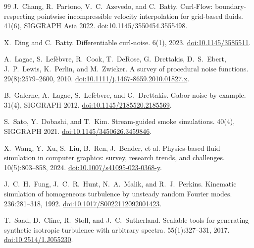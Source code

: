 \documentclass[11pt]{article}
\theoremstyle{remark}
\begin{document}
\begin{thebibliography}{99}
J.~Chang, R.~Partono, V.~C.~Azevedo, and C.~Batty.
\newblock Curl-Flow: boundary-respecting pointwise incompressible velocity
interpolation for grid-based fluids.
 41(6), SIGGRAPH Asia 2022.
\newblock \href{https://doi.org/10.1145/3550454.3555498}{doi:10.1145/3550454.3555498}.

X.~Ding and C.~Batty.
\newblock Differentiable curl-noise.
 6(1), 2023.
\newblock \href{https://doi.org/10.1145/3585511}{doi:10.1145/3585511}.

A.~Lagae, S.~Lef\`ebvre, R.~Cook, T.~DeRose, G.~Drettakis, D.~S.~Ebert,
J.~P.~Lewis, K.~Perlin, and M.~Zwicker.
\newblock A survey of procedural noise functions.
 29(8):2579--2600, 2010.
\newblock \href{https://doi.org/10.1111/j.1467-8659.2010.01827.x}{doi:10.1111/j.1467-8659.2010.01827.x}.

B.~Galerne, A.~Lagae, S.~Lef\`ebvre, and G.~Drettakis.
\newblock Gabor noise by example.
 31(4), SIGGRAPH 2012.
\newblock \href{https://doi.org/10.1145/2185520.2185569}{doi:10.1145/2185520.2185569}.

S.~Sato, Y.~Dobashi, and T.~Kim.
\newblock Stream-guided smoke simulations.
 40(4), SIGGRAPH 2021.
\newblock \href{https://doi.org/10.1145/3450626.3459846}{doi:10.1145/3450626.3459846}.

X.~Wang, Y.~Xu, S.~Liu, B.~Ren, J.~Bender, et al.
\newblock Physics-based fluid simulation in computer graphics: survey, research
trends, and challenges.
 10(5):803--858, 2024.
\newblock \href{https://doi.org/10.1007/s41095-023-0368-y}{doi:10.1007/s41095-023-0368-y}.

J.~C.~H.~Fung, J.~C.~R.~Hunt, N.~A.~Malik, and R.~J.~Perkins.
\newblock Kinematic simulation of homogeneous turbulence by unsteady random Fourier modes.
 236:281--318, 1992.
\newblock \href{https://doi.org/10.1017/S0022112092001423}{doi:10.1017/S0022112092001423}.

T.~Saad, D.~Cline, R.~Stoll, and J.~C.~Sutherland.
\newblock Scalable tools for generating synthetic isotropic turbulence with arbitrary spectra.
 55(1):327--331, 2017.
\newblock \href{https://doi.org/10.2514/1.J055230}{doi:10.2514/1.J055230}.

\end{thebibliography}
\end{document}
